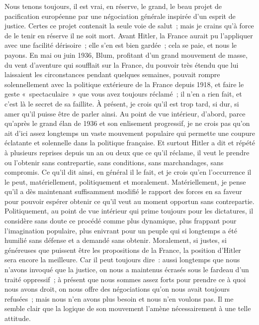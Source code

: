 \documentclass[french,twoside]{book} %
\begin{document}
Nous tenons toujours, il est vrai, en réserve, le grand, le beau projet de pacification européenne par une négociation générale inspirée d'un esprit de justice. Certes ce projet contenait la seule voie de salut ; mais je crains qu'à force de le tenir en réserve il ne soit mort. Avant Hitler, la France aurait pu l'appliquer avec une facilité dérisoire ; elle s'en est bien gardée ; cela se paie, et nous le payons. En mai ou juin 1936, Blum, profitant d'un grand mouve­ment de masse, du vent d'aventure qui soufflait sur la France, du pouvoir très étendu que lui laissaient les circonstances pendant quelques semaines, pouvait rompre solennellement avec la politique extérieure de la France depuis 1918, et faire le geste « spectaculaire » que vous avez toujours réclamé ; il n'en a rien fait, et c'est là le secret de sa faillite. À présent, je crois qu'il est trop tard, si dur, si amer qu'il puisse être de parler ainsi. Au point de vue intérieur, d'abord, parce qu'après le grand élan de 1936 et son enlisement progressif, je ne crois pas qu'on ait d'ici assez longtemps un vaste mouvement populaire qui permette une coupure éclatante et solennelle dans la politique française. Et surtout Hitler a dit et répété à plusieurs reprises depuis un an ou deux que ce qu'il réclame, il veut le prendre ou l'obtenir sans contrepartie, sans conditions, sans marchandages, sans compromis. Ce qu'il dit ainsi, en général il le fait, et je crois qu'en l'occurrence il le peut, matériellement, politiquement et moralement. Matériellement, je pense qu'il a dès maintenant suffisamment modifié le rapport des forces en sa faveur pour pouvoir espérer obtenir ce qu'il veut au moment opportun sans contrepartie. Politiquement, au point de vue intérieur qui prime toujours pour les dictatures, il considère sans doute ce procédé comme plus dynamique, plus frappant pour l'imagination populaire, plus enivrant pour un peuple qui si longtemps a été humilié sans défense et a demandé sans obtenir. Moralement, si justes, si généreuses que puissent être les propositions de la France, la position d'Hitler sera encore la meilleure. Car il peut toujours dire : aussi longtemps que nous n'avons invoqué que la justice, on nous a maintenus écrasés sous le fardeau d'un traité oppressif ; à présent que nous sommes assez forts pour prendre ce à quoi nous avons droit, on nous offre des négociations qu'on nous avait toujours refusées ; mais nous n'en avons plus besoin et nous n'en voulons pas. Il me semble clair que la logique de son mouvement l'amène nécessairement à une telle attitude.\par
\end{document}
